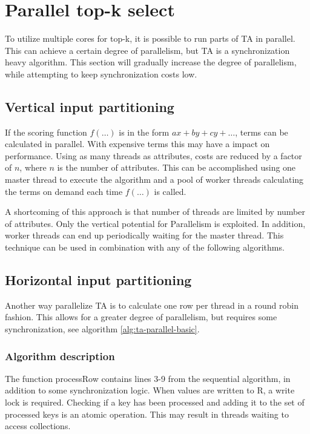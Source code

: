 \section{Parallel top-k select}
\label{sec:parallel-top-k}

To utilize multiple cores for top-k, it is possible to run parts of TA
in parallel. This can achieve a certain degree of parallelism, but TA
is a synchronization heavy algorithm. This section will gradually
increase the degree of parallelism, while attempting to keep
synchronization costs low.

\subsection{Vertical input partitioning}

If the scoring function $f(\ldots)$ is in the form $ax + by + cy +
\ldots$, terms can be calculated in parallel. With expensive terms
this may have a impact on performance. Using as many threads as
attributes, costs are reduced by a factor of $n$, where $n$ is the
number of attributes. This can be accomplished using one master thread
to execute the algorithm and a pool of worker threads calculating the
terms on demand each time $f(\ldots)$ is called.

A shortcoming of this approach is that number of threads are limited
by number of attributes. Only the vertical potential for Parallelism
is exploited. In addition, worker threads can end up periodically
waiting for the master thread. This technique can be used in
combination with any of the following algorithms.

\subsection{Horizontal input partitioning}

Another way parallelize TA is to calculate one row per thread in a
round robin fashion. This allows for a greater degree of parallelism,
but requires some synchronization, see algorithm
\ref{alg:ta-parallel-basic}. 

\subsubsection{Algorithm description}

The function processRow contains lines 3-9 from the sequential
algorithm, in addition to some synchronization logic. When values are
written to R, a write lock is required. Checking if a key has been
processed and adding it to the set of processed keys is an atomic
operation. This may result in threads waiting to access collections.


